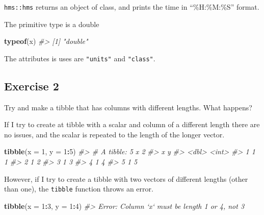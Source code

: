 \documentclass[]{book}
\newenvironment{Shaded}{\begin{snugshade}}{\end{snugshade}}
\newcommand{\CommentTok}[1]{\textcolor[rgb]{0.56,0.35,0.01}{\textit{#1}}}
\newcommand{\DataTypeTok}[1]{\textcolor[rgb]{0.13,0.29,0.53}{#1}}
\newcommand{\DecValTok}[1]{\textcolor[rgb]{0.00,0.00,0.81}{#1}}
\newcommand{\KeywordTok}[1]{\textcolor[rgb]{0.13,0.29,0.53}{\textbf{#1}}}
\newcommand{\NormalTok}[1]{#1}
\newcommand{\OperatorTok}[1]{\textcolor[rgb]{0.81,0.36,0.00}{\textbf{#1}}}
\theoremstyle{plain}
\theoremstyle{remark}
\theoremstyle{definition}
\theoremstyle{definition}
\theoremstyle{definition}
\theoremstyle{remark}
\begin{document}
\texttt{hms::hms} returns an object of class, and prints the time in
``\%H:\%M:\%S'' format.

The primitive type is a double

\begin{Shaded}
\begin{Highlighting}[]
\KeywordTok{typeof}\NormalTok{(x)}
\CommentTok{#> [1] "double"}
\end{Highlighting}
\end{Shaded}

The attributes is uses are \texttt{"units"} and \texttt{"class"}.

\begin{Shaded}
\end{Shaded}

\hypertarget{exercise-2-54}{%
\subsection{Exercise 2}\label{exercise-2-54}}

Try and make a tibble that has columns with different lengths. What
happens?

If I try to create at tibble with a scalar and column of a different
length there are no issues, and the scalar is repeated to the length of
the longer vector.

\begin{Shaded}
\begin{Highlighting}[]
\KeywordTok{tibble}\NormalTok{(}\DataTypeTok{x =} \DecValTok{1}\NormalTok{, }\DataTypeTok{y =} \DecValTok{1}\OperatorTok{:}\DecValTok{5}\NormalTok{)}
\CommentTok{#> # A tibble: 5 x 2}
\CommentTok{#>       x     y}
\CommentTok{#>   <dbl> <int>}
\CommentTok{#> 1     1     1}
\CommentTok{#> 2     1     2}
\CommentTok{#> 3     1     3}
\CommentTok{#> 4     1     4}
\CommentTok{#> 5     1     5}
\end{Highlighting}
\end{Shaded}

However, if I try to create a tibble with two vectors of different
lengths (other than one), the \texttt{tibble} function throws an error.

\begin{Shaded}
\begin{Highlighting}[]
\KeywordTok{tibble}\NormalTok{(}\DataTypeTok{x =} \DecValTok{1}\OperatorTok{:}\DecValTok{3}\NormalTok{, }\DataTypeTok{y =} \DecValTok{1}\OperatorTok{:}\DecValTok{4}\NormalTok{)}
\CommentTok{#> Error: Column `x` must be length 1 or 4, not 3}
\end{Highlighting}
\end{Shaded}
\end{document}
